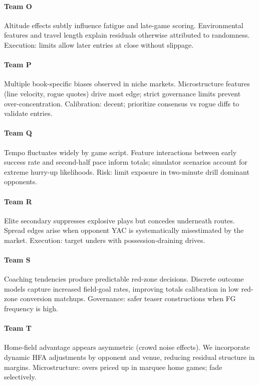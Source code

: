 \documentclass[12pt]{report}  %
\numberwithin{equation}{section}
\theoremstyle{plain}
\theoremstyle{definition}
\theoremstyle{remark}
\begin{document}
\paragraph{Team O} Altitude effects subtly influence fatigue and late-game scoring. Environmental features and travel length explain residuals otherwise attributed to randomness. Execution: limits allow later entries at close without slippage.

\paragraph{Team P} Multiple book-specific biases observed in niche markets. Microstructure features (line velocity, rogue quotes) drive most edge; strict governance limits prevent over-concentration. Calibration: decent; prioritize consensus vs rogue diffs to validate entries.

\paragraph{Team Q} Tempo fluctuates widely by game script. Feature interactions between early success rate and second-half pace inform totals; simulator scenarios account for extreme hurry-up likelihoods. Risk: limit exposure in two‑minute drill dominant opponents.

\paragraph{Team R} Elite secondary suppresses explosive plays but concedes underneath routes. Spread edges arise when opponent YAC is systematically misestimated by the market. Execution: target unders with possession‑draining drives.

\paragraph{Team S} Coaching tendencies produce predictable red-zone decisions. Discrete outcome models capture increased field-goal rates, improving totals calibration in low red-zone conversion matchups. Governance: safer teaser constructions when FG frequency is high.

\paragraph{Team T} Home-field advantage appears asymmetric (crowd noise effects). We incorporate dynamic HFA adjustments by opponent and venue, reducing residual structure in margins. Microstructure: overs priced up in marquee home games; fade selectively.
\end{document}
